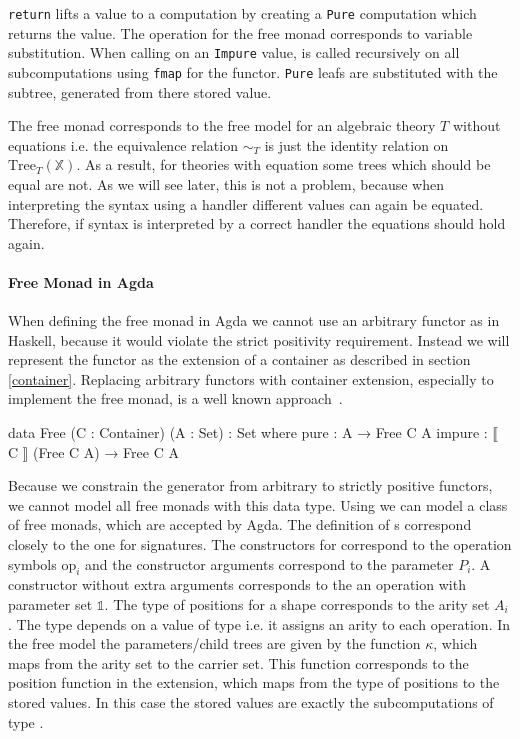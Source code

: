 \texttt{return} lifts a value to a computation by creating a
\texttt{Pure} computation which returns the value.
The \bind{} operation for the free monad corresponds to variable substitution.
When calling \bind{} on an \texttt{Impure} value, \bind{} is called
recursively on all subcomputations using \texttt{fmap} for the
functor.
\texttt{Pure} leafs are substituted with the subtree, generated
from there stored value.

The free monad corresponds to the free model for an algebraic theory $T$ without
equations i.e. the equivalence relation $\sim_T$ is just the identity relation on
$\mathrm{Tree}_T(\mathbb{X})$.
As a result, for theories with equation some trees which should be equal are
not.
As we will see later, this is not a problem, because when interpreting the
syntax using a handler different values can again be equated.
Therefore, if syntax is interpreted by a correct handler the equations should
hold again.


\paragraph{Free Monad in Agda}
When defining the free monad in Agda we cannot use an arbitrary functor as in
Haskell, because it would violate the strict positivity requirement.
Instead we will represent the functor as the extension of a container as
described in section \ref{container}.
Replacing arbitrary functors with container extension, especially to implement
the free monad, is a well known
approach~\cite{DBLP:journals/programming/DylusCT19,DBLP:conf/haskell/ChristiansenDB19}.

\begin{code}
data Free (C : Container) (A : Set) : Set where
  pure    : A → Free C A
  impure  : ⟦ C ⟧ (Free C A) → Free C A
\end{code}
Because we constrain the generator from arbitrary to strictly positive functors,
we cannot model all free monads with this data type.
Using  we can model a class of free monads, which are
accepted by Agda.
The definition of s correspond closely to the one for
signatures.
The constructors for  correspond to the operation symbols
$\mathrm{op}_i$ and the constructor arguments correspond to the parameter $P_i$.
A constructor without extra arguments corresponds to the an operation with
parameter set $\mathbb{1}$.
The type of positions for a shape corresponds to the arity set $A_i$.
The  type depends on a value of type  i.e. it
assigns an arity to each operation.
In the free model the parameters/child trees are given by the function $\kappa$,
which maps from the arity set to the carrier set.
This function corresponds to the position function in the
 extension, which maps from the type of positions to the
stored values.
In this case the stored values are exactly the subcomputations of type
\AgdaSpace{}\AgdaSpace{}.

